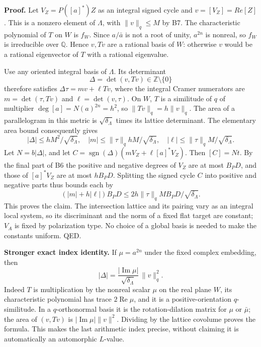 \textbf{Proof.} Let \(V_Z=P([a]^*)Z\) as an integral signed cycle and \(v=[V_Z]=R e[Z]\). This is a nonzero element of \(\Lambda\), with \(\|v\|_q\leq M\) by B7. The characteristic polynomial of \(T\) on \(W\) is \(f_W\). Since \(a/\bar a\) is not a root of unity, \(a^{2n}\) is nonreal, so \(f_W\) is irreducible over \(\mathbb Q\). Hence \(v,Tv\) are a rational basis of \(W\): otherwise \(v\) would be a rational eigenvector of \(T\) with a rational eigenvalue.

Use any oriented integral basis of \(\Lambda\). Its determinant \[
 \Delta=\det(v,Tv)\in\mathbb Z\setminus\{0\}
\] therefore satisfies \(\Delta\tau=m v+\ell Tv\), where the integral Cramer numerators are \(m=\det(\tau,Tv)\) and \(\ell=\det(v,\tau)\). On \(W\), \(T\) is a similitude of \(q\) of multiplier \(\deg[a]=N(a)^{2n}=h^2\), so \(\|Tv\|_q=h\|v\|_q\). The area of a parallelogram in this metric is \(\sqrt{\delta_\Lambda}\) times its lattice determinant. The elementary area bound consequently gives \[
 |\Delta|\leq hM^2/\sqrt{\delta_\Lambda},\quad
 |m|\leq\|\tau\|_q hM/\sqrt{\delta_\Lambda},\quad
 |\ell|\leq\|\tau\|_q M/\sqrt{\delta_\Lambda}.
\] Let \(N=b|\Delta|\), and let \(C=\operatorname{sgn}(\Delta)(mV_Z+\ell[a]^*V_Z)\). Then \([C]=Nt\). By the final part of B6 the positive and negative degrees of \(V_Z\) are at most \(B_PD\), and those of \([a]^*V_Z\) are at most \(hB_PD\). Splitting the signed cycle \(C\) into positive and negative parts thus bounds each by \[
 (|m|+h|\ell|)B_PD\leq 2h\|\tau\|_q M B_PD/\sqrt{\delta_\Lambda}.
\] This proves the claim. The intersection lattice and its pairing vary as an integral local system, so its discriminant and the norm of a fixed flat target are constant; \(V_A\) is fixed by polarization type. No choice of a global basis is needed to make the constants uniform. QED.

\textbf{Stronger exact index identity.} If \(\mu=a^{2n}\) under the fixed complex embedding, then \[
 |\Delta|=\frac{|\operatorname{Im}\mu|}{\sqrt{\delta_\Lambda}}\,\|v\|_q^2.
\] Indeed \(T\) is multiplication by the nonreal scalar \(\mu\) on the real plane \(W\), its characteristic polynomial has trace \(2\operatorname{Re}\mu\), and it is a positive-orientation \(q\)-similitude. In a \(q\)-orthonormal basis it is the rotation-dilation matrix for \(\mu\) or \(\bar\mu\); the area of \((v,Tv)\) is \(|\operatorname{Im}\mu|\|v\|^2\). Dividing by the lattice covolume proves the formula. This makes the last arithmetic index precise, without claiming it is automatically an automorphic \(L\)-value.

